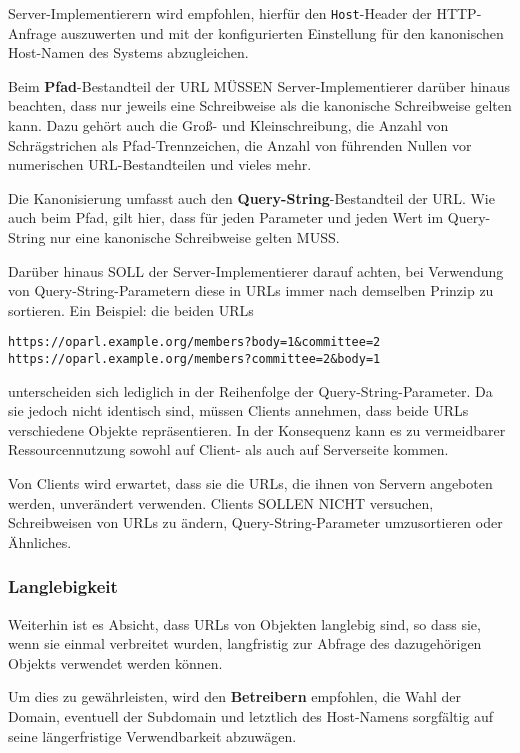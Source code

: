 \documentclass[,a4paper]{article}
\begin{document}
Server-Implementierern wird empfohlen, hierfür den \texttt{Host}-Header
der HTTP-Anfrage auszuwerten und mit der konfigurierten Einstellung für
den kanonischen Host-Namen des Systems abzugleichen.

Beim \textbf{Pfad}-Bestandteil der URL MÜSSEN Server-Implementierer
darüber hinaus beachten, dass nur jeweils eine Schreibweise als die
kanonische Schreibweise gelten kann. Dazu gehört auch die Groß- und
Kleinschreibung, die Anzahl von Schrägstrichen als Pfad-Trennzeichen,
die Anzahl von führenden Nullen vor numerischen URL-Bestandteilen und
vieles mehr.

Die Kanonisierung umfasst auch den \textbf{Query-String}-Bestandteil der
URL. Wie auch beim Pfad, gilt hier, dass für jeden Parameter und jeden
Wert im Query-String nur eine kanonische Schreibweise gelten MUSS.

Darüber hinaus SOLL der Server-Implementierer darauf achten, bei
Verwendung von Query-String-Parametern diese in URLs immer nach
demselben Prinzip zu sortieren. Ein Beispiel: die beiden URLs

\begin{verbatim}
https://oparl.example.org/members?body=1&committee=2
https://oparl.example.org/members?committee=2&body=1
\end{verbatim}

unterscheiden sich lediglich in der Reihenfolge der
Query-String-Parameter. Da sie jedoch nicht identisch sind, müssen
Clients annehmen, dass beide URLs verschiedene Objekte repräsentieren.
In der Konsequenz kann es zu vermeidbarer Ressourcennutzung sowohl auf
Client- als auch auf Serverseite kommen.

Von Clients wird erwartet, dass sie die URLs, die ihnen von Servern
angeboten werden, unverändert verwenden. Clients SOLLEN NICHT versuchen,
Schreibweisen von URLs zu ändern, Query-String-Parameter umzusortieren
oder Ähnliches.

\subsubsection{Langlebigkeit}\label{langlebigkeit}

Weiterhin ist es Absicht, dass URLs von Objekten langlebig sind, so dass
sie, wenn sie einmal verbreitet wurden, langfristig zur Abfrage des
dazugehörigen Objekts verwendet werden können.

Um dies zu gewährleisten, wird den \textbf{Betreibern} empfohlen, die
Wahl der Domain, eventuell der Subdomain und letztlich des Host-Namens
sorgfältig auf seine längerfristige Verwendbarkeit abzuwägen.
\end{document}
